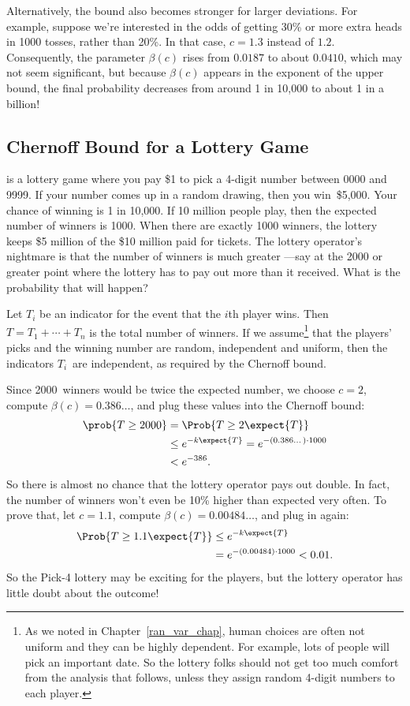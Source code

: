 Alternatively, the bound also becomes stronger for larger deviations.
For example, suppose we're interested in the odds of getting 30\% or
more extra heads in 1000 tosses, rather than 20\%.  In that case,
$c= 1.3$ instead of $1.2$.  Consequently, the parameter $\beta(c)$ rises from
$0.0187$ to about $0.0410$, which may not seem significant, but because
$\beta(c)$ appears in the exponent of the upper bound, the final probability
decreases from around 1 in 10,000 to about 1 in a billion!

\subsection{Chernoff Bound for a Lottery Game}

 is a lottery game where you pay \$1 to pick a 4-digit
number between 0000 and 9999.  If your number comes up in a random
drawing, then you win~\$5,000.  Your chance of winning is 1 in 10,000.
If 10 million people play, then the expected number of winners is
1000.  When there are exactly 1000 winners, the lottery keeps \$5
million of the \$10 million paid for tickets.  The lottery operator's
nightmare is that the number of winners is much greater ---say at the
2000 or greater point where the lottery has to pay out more than it
received.  What is the probability that will happen?

Let $T_i$ be an indicator for the event that the $i$th player wins.
Then $T = T_1 + \cdots + T_n$ is the total number of winners.  If we
assume\footnote{As we noted in Chapter~\ref{ran_var_chap}, human
  choices are often not uniform and they can be highly dependent.  For
  example, lots of people will pick an important date.  So the lottery
  folks should not get too much comfort from the analysis that
  follows, unless they assign random 4-digit numbers to each player.}
that the players' picks and the winning number are random, independent
and uniform, then the indicators $T_i$~are independent, as required by
the Chernoff bound.

Since 2000~winners would be twice the expected number, we choose $c =
2$, compute $\beta(c) = 0.386\dots$, and plug these values
into the Chernoff bound:
\begin{align*}
\prob{T \geq 2000} & = \Prob{T \geq 2 \expect{T}} \\
  & \leq e^{-k \expect{T}} = e^{- (0.386\dots) \cdot 1000} \\
  & < e^{-386}.
\end{align*}
So there is almost no chance that the lottery operator pays out
double.  In fact, the number of winners won't even be 10\% higher than
expected very often.  To prove that, let $c = 1.1$, compute $\beta(c)
= 0.00484\dots$, and plug in again:
\begin{align*}
\Prob{T \geq 1.1 \expect{T}} & \leq e^{-k \expect{T}} \\
  & = e^{- (0.00484)\cdot 1000} < 0.01.
\end{align*}
So the Pick-4 lottery may be exciting for the players, but the lottery
operator has little doubt about the outcome!

